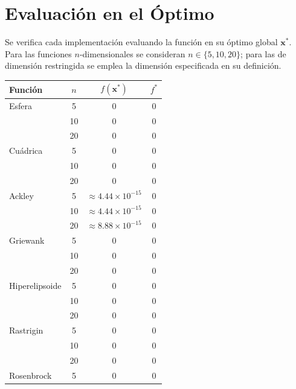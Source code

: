 \documentclass[11pt]{article}
\begin{document}
\section{Evaluaci\'on en el \'Optimo}

Se verifica cada implementaci\'on evaluando la funci\'on en su \'optimo global $\mathbf{x}^*$. Para las funciones $n$-dimensionales se consideran $n \in \{5, 10, 20\}$; para las de dimensi\'on restringida se emplea la dimensi\'on especificada en su definici\'on.

\begin{table}[H]
\centering
\begin{tabular}{lccc}
\hline\hline
Funci\'on        & $n$  & $f(\mathbf{x}^*)$      & $f^*$ \\
\hline
Esfera           & 5    & $0$                    & 0 \\
                 & 10   & $0$                    & 0 \\
                 & 20   & $0$                    & 0 \\
\hline
Cu\'adrica       & 5    & $0$                    & 0 \\
                 & 10   & $0$                    & 0 \\
                 & 20   & $0$                    & 0 \\
\hline
Ackley           & 5    & $\approx 4.44\times10^{-15}$ & 0 \\
                 & 10   & $\approx 4.44\times10^{-15}$ & 0 \\
                 & 20   & $\approx 8.88\times10^{-15}$ & 0 \\
\hline
Griewank         & 5    & $0$                    & 0 \\
                 & 10   & $0$                    & 0 \\
                 & 20   & $0$                    & 0 \\
\hline
Hiperelipsoide   & 5    & $0$                    & 0 \\
                 & 10   & $0$                    & 0 \\
                 & 20   & $0$                    & 0 \\
\hline
Rastrigin        & 5    & $0$                    & 0 \\
                 & 10   & $0$                    & 0 \\
                 & 20   & $0$                    & 0 \\
\hline
Rosenbrock       & 5    & $0$                    & 0 \\

\end{tabular}
\end{table}
\end{document}
